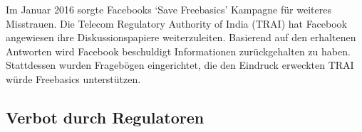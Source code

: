 \documentclass{article}
\begin{document}
	
Im Januar 2016 sorgte Facebooks `Save Freebasics' Kampagne für weiteres Misstrauen. Die Telecom Regulatory Authority of India (TRAI) hat Facebook angewiesen ihre Diskussionspapiere weiterzuleiten. Basierend auf den erhaltenen Antworten wird Facebook beschuldigt Informationen zurückgehalten zu haben.
Stattdessen wurden Fragebögen eingerichtet, die den Eindruck erweckten TRAI würde Freebasics unterstützen.

\subsection{Verbot durch Regulatoren}



\end{document}
